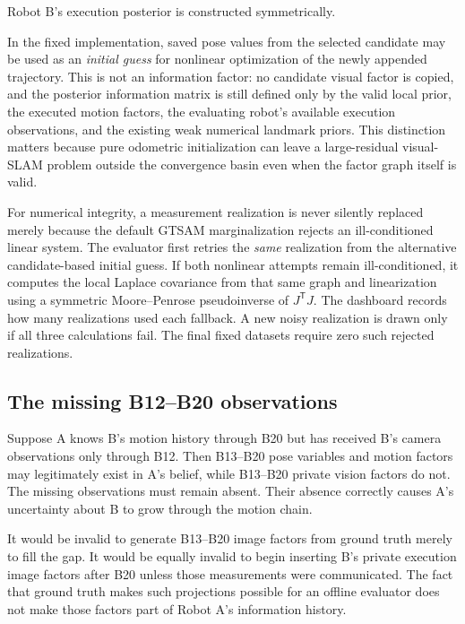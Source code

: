 \documentclass[11pt,a4paper]{article}
\begin{document}
Robot B's execution posterior is constructed symmetrically.

In the fixed implementation, saved pose values from the selected candidate may
be used as an \emph{initial guess} for nonlinear optimization of the newly
appended trajectory.  This is not an information factor: no candidate visual
factor is copied, and the posterior information matrix is still defined only
by the valid local prior, the executed motion factors, the evaluating robot's
available execution observations, and the existing weak numerical landmark
priors.  This distinction matters because pure odometric initialization can
leave a large-residual visual-SLAM problem outside the convergence basin even
when the factor graph itself is valid.

For numerical integrity, a measurement realization is never silently replaced
merely because the default GTSAM marginalization rejects an ill-conditioned
linear system.  The evaluator first retries the \emph{same} realization from
the alternative candidate-based initial guess.  If both nonlinear attempts
remain ill-conditioned, it computes the local Laplace covariance from that
same graph and linearization using a symmetric Moore--Penrose pseudoinverse of
$J^{\mathsf T}J$.  The dashboard records how many realizations used each
fallback.  A new noisy realization is drawn only if all three calculations
fail.  The final fixed datasets require zero such rejected realizations.

\subsection{The missing B12--B20 observations}

Suppose A knows B's motion history through B20 but has received B's camera
observations only through B12.  Then B13--B20 pose variables and motion factors
may legitimately exist in A's belief, while B13--B20 private vision factors do
not.  The missing observations must remain absent.  Their absence correctly
causes A's uncertainty about B to grow through the motion chain.

It would be invalid to generate B13--B20 image factors from ground truth merely
to fill the gap.  It would be equally invalid to begin inserting B's private
execution image factors after B20 unless those measurements were communicated.
The fact that ground truth makes such projections possible for an offline
evaluator does not make those factors part of Robot A's information history.
\end{document}
